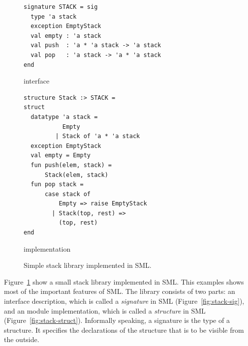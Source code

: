 \documentclass[workingdraft]{usetex-v1}
\begin{document}
\begin{figure}[thp]
\mbox{}\hfill{}

\begin{subfloat}
\begin{minipage}[b]{.46\linewidth}
\begin{verbatim}
signature STACK = sig 
  type 'a stack
  exception EmptyStack
  val empty : 'a stack
  val push  : 'a * 'a stack -> 'a stack
  val pop   : 'a stack -> 'a * 'a stack
end
\end{verbatim}
\end{minipage}
\caption{\label{fig:stack-sig}interface}
\end{subfloat}
\qquad
\begin{subfloat}
\begin{minipage}[b]{.46\linewidth}
\begin{verbatim}
structure Stack :> STACK =
struct
  datatype 'a stack =
           Empty
         | Stack of 'a * 'a stack
  exception EmptyStack
  val empty = Empty
  fun push(elem, stack) = 
      Stack(elem, stack)
  fun pop stack =
      case stack of
          Empty => raise EmptyStack
        | Stack(top, rest) => 
          (top, rest)
end
\end{verbatim}
\end{minipage}
\caption{\label{fig:stack-struct}implementation}
\end{subfloat}
\hfill\mbox{}
\caption{Simple stack library implemented in SML.}
  \label{fig:stack-lib}
\end{figure}

Figure~\ref{fig:stack-lib} show a small stack library implemented in
SML.  This examples shows most of the important features of SML.  The
library consists of two parts: an interface description, which is
called a \emph{signature} in SML (Figure~\ref{fig:stack-sig}), and an
module implementation, which is called a \emph{structure} in SML
(Figure~\ref{fig:stack-struct}).  Informally speaking, a
signature is the type of a structure. It specifies the
declarations of the structure that is to be visible from the outside.
\end{document}
